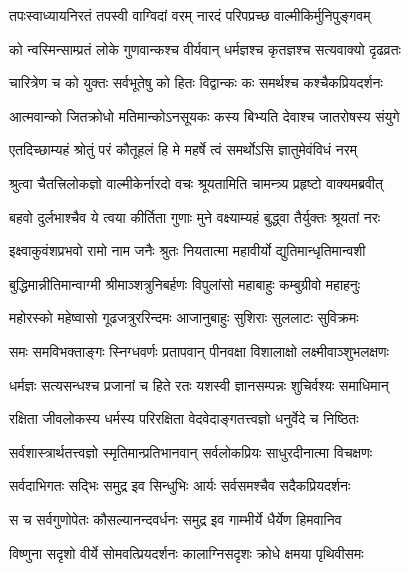 

\twolineshloka
{तपःस्वाध्यायनिरतं तपस्वी वाग्विदां वरम्}
{नारदं परिपप्रच्छ वाल्मीकिर्मुनिपुङ्गवम्} %

\twolineshloka
{को न्वस्मिन्साम्प्रतं लोके गुणवान्कश्च वीर्यवान्}
{धर्मज्ञश्च कृतज्ञश्च सत्यवाक्यो दृढव्रतः} %

\twolineshloka
{चारित्रेण च को युक्तः सर्वभूतेषु को हितः}
{विद्वान्कः कः समर्थश्च कश्चैकप्रियदर्शनः} %

\twolineshloka
{आत्मवान्को जितक्रोधो मतिमान्कोऽनसूयकः}
{कस्य बिभ्यति देवाश्च जातरोषस्य संयुगे} %

\twolineshloka
{एतदिच्छाम्यहं श्रोतुं परं कौतूहलं हि मे}
{महर्षे त्वं समर्थोऽसि ज्ञातुमेवंविधं नरम्} %

\twolineshloka
{श्रुत्वा चैतत्त्रिलोकज्ञो वाल्मीकेर्नारदो वचः}
{श्रूयतामिति चामन्त्र्य प्रहृष्टो वाक्यमब्रवीत्} %

\twolineshloka
{बहवो दुर्लभाश्चैव ये त्वया कीर्तिता गुणाः}
{मुने वक्ष्याम्यहं बुद्ध्वा तैर्युक्तः श्रूयतां नरः} %

\twolineshloka
{इक्ष्वाकुवंशप्रभवो रामो नाम जनैः श्रुतः}
{नियतात्मा महावीर्यो द्युतिमान्धृतिमान्वशी} %

\twolineshloka
{बुद्धिमान्नीतिमान्वाग्मी श्रीमाञ्शत्रुनिबर्हणः}
{विपुलांसो महाबाहुः कम्बुग्रीवो महाहनुः} %

\twolineshloka
{महोरस्को महेष्वासो गूढजत्रुररिन्दमः}
{आजानुबाहुः सुशिराः सुललाटः सुविक्रमः} %

\twolineshloka
{समः समविभक्ताङ्गः स्निग्धवर्णः प्रतापवान्}
{पीनवक्षा विशालाक्षो लक्ष्मीवाञ्शुभलक्षणः} %

\twolineshloka
{धर्मज्ञः सत्यसन्धश्च प्रजानां च हिते रतः}
{यशस्वी ज्ञानसम्पन्नः शुचिर्वश्यः समाधिमान्} %

\twolineshloka
{रक्षिता जीवलोकस्य धर्मस्य परिरक्षिता}
{वेदवेदाङ्गतत्त्वज्ञो धनुर्वेदे च निष्ठितः} %

\twolineshloka
{सर्वशास्त्रार्थतत्त्वज्ञो स्मृतिमान्प्रतिभानवान्}
{सर्वलोकप्रियः साधुरदीनात्मा विचक्षणः} %

\twolineshloka
{सर्वदाभिगतः सद्भिः समुद्र इव सिन्धुभिः}
{आर्यः सर्वसमश्चैव सदैकप्रियदर्शनः} %

\twolineshloka
{स च सर्वगुणोपेतः कौसल्यानन्दवर्धनः}
{समुद्र इव गाम्भीर्ये धैर्येण हिमवानिव} %

\twolineshloka
{विष्णुना सदृशो वीर्ये सोमवत्प्रियदर्शनः}
{कालाग्निसदृशः क्रोधे क्षमया पृथिवीसमः} %

